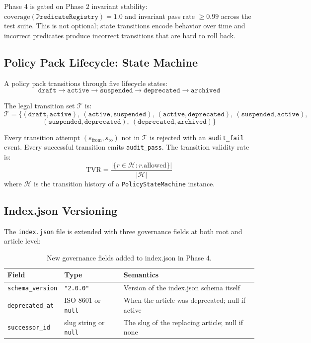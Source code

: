 \documentclass[12pt,letterpaper]{article}
\theoremstyle{definition}
\theoremstyle{remark}
\begin{document}
Phase 4 is gated on Phase 2 invariant stability: \(\text{coverage}(\mathtt{PredicateRegistry}) = 1.0\)
and invariant pass rate \(\geq 0.99\) across the test suite. This is not optional;
state transitions encode behavior over time and incorrect predicates produce
incorrect transitions that are hard to roll back.

\subsection{Policy Pack Lifecycle: State Machine}

A policy pack transitions through five lifecycle states:
\[
  \texttt{draft} \to \texttt{active} \to \texttt{suspended} \to \texttt{deprecated} \to \texttt{archived}
  \tag{17}
\]

The legal transition set \(\mathcal{T}\) is:
\[
  \mathcal{T} = \{(\texttt{draft}, \texttt{active}),\ (\texttt{active}, \texttt{suspended}),\
  (\texttt{active}, \texttt{deprecated}),\ (\texttt{suspended}, \texttt{active}),
\]
\[
  (\texttt{suspended}, \texttt{deprecated}),\ (\texttt{deprecated}, \texttt{archived})\}
  \tag{18}
\]

Every transition attempt \((s_{\text{from}}, s_{\text{to}})\) not in \(\mathcal{T}\) is
rejected with an \texttt{audit\_fail} event. Every successful transition emits
\texttt{audit\_pass}. The transition validity rate is:
\[
  \text{TVR} = \frac{|\{r \in \mathcal{H} : r.\text{allowed}\}|}{|\mathcal{H}|} \tag{19}
\]
where \(\mathcal{H}\) is the transition history of a \texttt{PolicyStateMachine} instance.

\subsection{Index.json Versioning}

The \texttt{index.json} file is extended with three governance fields at both root and
article level:

\begin{table}[H]
\centering
\small
\begin{tabular}{@{}llp{5cm}@{}}
\toprule
\textbf{Field} & \textbf{Type} & \textbf{Semantics} \\
\midrule
\texttt{schema\_version} & \texttt{"2.0.0"} & Version of the index.json schema itself \\
\texttt{deprecated\_at}  & ISO-8601 or \texttt{null} & When the article was deprecated; null if active \\
\texttt{successor\_id}   & slug string or \texttt{null} & The slug of the replacing article; null if none \\
\bottomrule
\end{tabular}
\caption{New governance fields added to index.json in Phase 4.}
\end{table}
\end{document}

